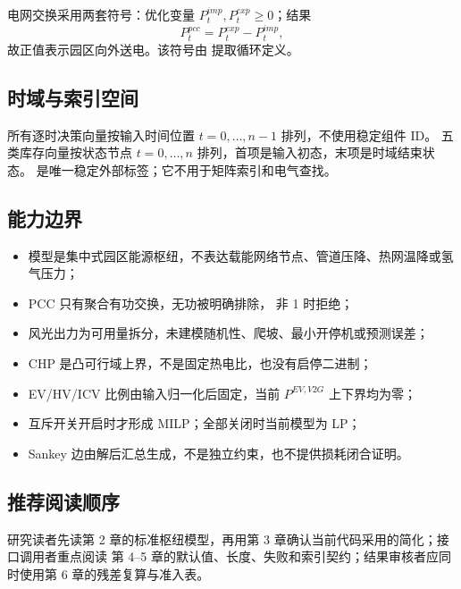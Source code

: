 电网交换采用两套符号：优化变量 $P_t^{imp},P_t^{exp}\ge0$；结果
\begin{equation}
P_t^{pcc}=P_t^{exp}-P_t^{imp},
\end{equation}
故正值表示园区向外送电。该符号由
提取循环定义。

\subsection{时域与索引空间}

所有逐时决策向量按输入时间位置 $t=0,\ldots,n-1$ 排列，不使用稳定组件 ID。
五类库存向量按状态节点 $t=0,\ldots,n$ 排列，首项是输入初态，末项是时域结束状态。
 是唯一稳定外部标签；它不用于矩阵索引和电气查找。

\subsection{能力边界}

\begin{itemize}
  \item 模型是集中式园区能源枢纽，不表达载能网络节点、管道压降、热网温降或氢气压力；
  \item PCC 只有聚合有功交换，无功被明确排除， 非 1 时拒绝；
  \item 风光出力为可用量拆分，未建模随机性、爬坡、最小开停机或预测误差；
  \item CHP 是凸可行域上界，不是固定热电比，也没有启停二进制；
  \item EV/HV/ICV 比例由输入归一化后固定，当前 $P^{EV,V2G}$ 上下界均为零；
  \item 互斥开关开启时才形成 MILP；全部关闭时当前模型为 LP；
  \item Sankey 边由解后汇总生成，不是独立约束，也不提供损耗闭合证明。
\end{itemize}

\subsection{推荐阅读顺序}

研究读者先读第 2 章的标准枢纽模型，再用第 3 章确认当前代码采用的简化；接口调用者重点阅读
第 4--5 章的默认值、长度、失败和索引契约；结果审核者应同时使用第 6 章的残差复算与准入表。

